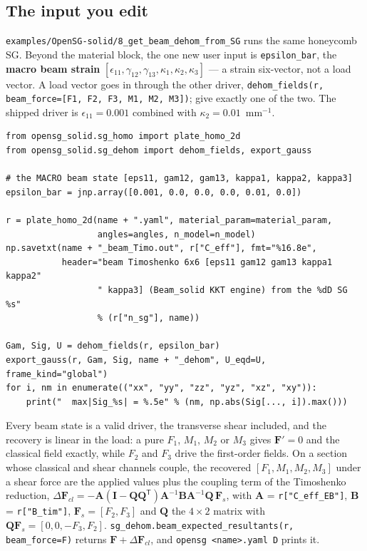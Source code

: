 \subsection{The input you edit}

\texttt{examples/OpenSG-solid/8\_get\_beam\_dehom\_from\_SG} runs the same
honeycomb SG. Beyond the material block, the one new user input is
\texttt{epsilon\_bar}, the \textbf{macro beam strain}
$[\epsilon_{11},\gamma_{12},\gamma_{13},\kappa_1,\kappa_2,\kappa_3]$ --- a
strain six-vector, not a load vector. A load vector goes in through the other
driver, \texttt{dehom\_fields(r, beam\_force=[F1, F2, F3, M1, M2, M3])}; give
exactly one of the two. The shipped driver is
$\epsilon_{11} = 0.001$ combined with $\kappa_2 = 0.01$~mm$^{-1}$.

\begin{lstlisting}[style=opensg,caption={The body of beam\_dehom\_sg.py after the shared material block.}]
from opensg_solid.sg_homo import plate_homo_2d
from opensg_solid.sg_dehom import dehom_fields, export_gauss

# the MACRO beam state [eps11, gam12, gam13, kappa1, kappa2, kappa3]
epsilon_bar = jnp.array([0.001, 0.0, 0.0, 0.0, 0.01, 0.0])

r = plate_homo_2d(name + ".yaml", material_param=material_param,
                  angles=angles, n_model=n_model)
np.savetxt(name + "_beam_Timo.out", r["C_eff"], fmt="%16.8e",
           header="beam Timoshenko 6x6 [eps11 gam12 gam13 kappa1 kappa2"
                  " kappa3] (Beam_solid KKT engine) from the %dD SG %s"
                  % (r["n_sg"], name))

Gam, Sig, U = dehom_fields(r, epsilon_bar)
export_gauss(r, Gam, Sig, name + "_dehom", U_eqd=U, frame_kind="global")
for i, nm in enumerate(("xx", "yy", "zz", "yz", "xz", "xy")):
    print("  max|Sig_%s| = %.5e" % (nm, np.abs(Sig[..., i]).max()))
\end{lstlisting}

Every beam state is a valid driver, the transverse shear included, and the
recovery is linear in the load: a pure $F_1$, $M_1$, $M_2$ or $M_3$ gives
$\mathbf{F}' = 0$ and the classical field exactly, while $F_2$ and $F_3$ drive
the first-order fields. On a section whose classical and shear channels couple,
the recovered $[F_1, M_1, M_2, M_3]$ under a shear force are the applied values
plus the coupling term of the Timoshenko reduction,
$\Delta\mathbf{F}_{cl} = -\mathbf{A}(\mathbf{I} - \mathbf{Q}\mathbf{Q}^{\mathsf T})
\mathbf{A}^{-1}\mathbf{B}\mathbf{A}^{-1}\mathbf{Q}\,\mathbf{F}_s$, with
$\mathbf{A}$ = \texttt{r["C\_eff\_EB"]}, $\mathbf{B}$ = \texttt{r["B\_tim"]},
$\mathbf{F}_s = [F_2, F_3]$ and $\mathbf{Q}$ the $4\times2$ matrix with
$\mathbf{Q}\mathbf{F}_s = [0, 0, -F_3, F_2]$.
\texttt{sg\_dehom.beam\_expected\_resultants(r, beam\_force=F)} returns
$\mathbf{F} + \Delta\mathbf{F}_{cl}$, and \texttt{opensg <name>.yaml D} prints it.

